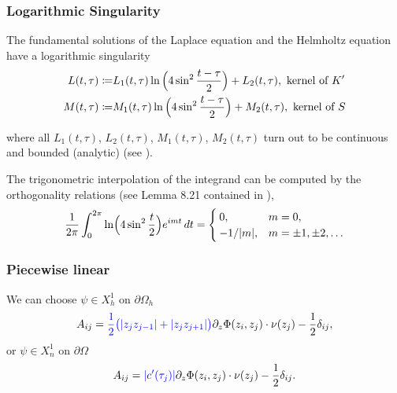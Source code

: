 \documentclass[handout]{beamer}
\begin{document}
\begin{frame}
 \frametitle{Logarithmic Singularity}
The fundamental solutions
of the Laplace equation and the Helmholtz equation have a {\color{blue}logarithmic 
singularity}
\begin{align}
 L(t,\tau)
 \coloneqq
 &L_1(t,\tau)\ln\Big(4\sin^2\frac{t-\tau}{2}\Big)+L_2(t,\tau),
 \textup{ kernel of } K'
 \label{eq:def-kernel-L}\\
 M(t,\tau)
 \coloneqq
 &M_1(t,\tau)\ln\Big(4\sin^2\frac{t-\tau}{2}\Big)+M_2(t,\tau),
 \textup{ kernel of } S
 \label{eq:def-kernel-M}
\end{align}

where all $L_1(t,\tau)$, $L_2(t,\tau)$, $M_1(t,\tau)$, $M_2(t,\tau)$ turn out
to be continuous and bounded (analytic) (see \cite{colton-kress:book}).
\pause
\par
\begin{lemma}
The {\color{blue} trigonometric interpolation} of the integrand can be computed
by the orthogonality relations
(see Lemma 8.21 contained in \cite{kress:book}),
\begin{equation}
 \frac{1}{2\pi}\int_0^{2\pi}\ln\Bigl(4\sin^2\frac{t}{2}\Bigr)e^{imt}\,dt=
 \begin{cases}
  0, & m=0, \\
  -1/|m|, & m=\pm1,\pm2,\dots
 \end{cases}
\end{equation}
\end{lemma}
\end{frame}
\begin{frame}
 \frametitle{Piecewise linear}
We can choose $\psi\in X^1_h$ on $\partial\Omega_h$
\begin{equation}
\label{eq:Aij-X1h}
 A_{ij} = {\color{blue}\frac{1}{2}\big(|z_jz_{j-1}| + |z_jz_{j+1}|\big)}\partial_{z}\Phi(z_i,z_j)\cdot \nu(z_j) - \frac{1}{2} \delta_{ij},
\end{equation}
\pause
or $\psi\in X^1_n$ on $\partial\Omega$
\begin{equation}
\label{eq:Aij-X1h}
 A_{ij} = {\color{blue}|c'(\tau_j)|}\partial_{z}\Phi(z_i,z_j)\cdot \nu(z_j) - \frac{1}{2} \delta_{ij}.
\end{equation}
\end{frame}
\end{document}
